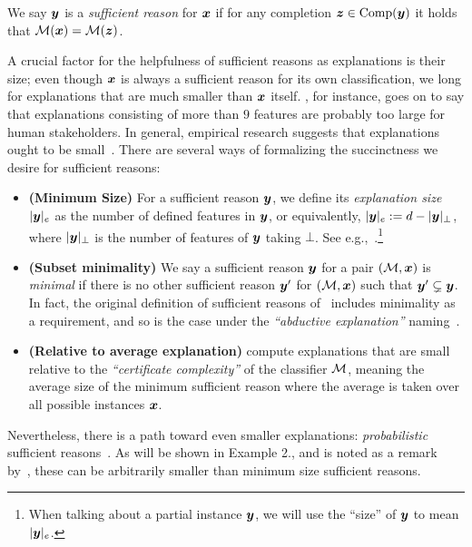 \begin{definition}
	We say ${\bm{y}}$ is a \emph{sufficient reason} for ${\bm{x}}$ if for any completion ${\bm{z}} \in \operatorname{Comp}({\bm{y}})$ it holds that $\mathcal{M}({\bm{x}}) = \mathcal{M}({\bm{z}})$.
	\label{def:sufficient-reason}
\end{definition}
A crucial factor for the helpfulness of sufficient reasons as explanations is their size; even though ${\bm{x}}$ is always a sufficient reason for its own classification, we long for explanations that are much smaller than ${\bm{x}}$ itself. \citet{millerMagicalNumberSeven1956}, for instance, goes on to say that explanations consisting of more than $9$ features are probably too large for human stakeholders. In general, empirical research suggests that explanations ought to be small~\citep{Narayanan_Chen_He_Kim_Gershman_Doshi-Velez_2018, Lage_Chen_He_Narayanan_Kim_Gershman_Doshi-Velez_2019}.
There are several ways of formalizing the succinctness we desire for sufficient reasons:

\begin{itemize}
    \item \textbf{(Minimum Size)} For a sufficient reason ${\bm{y}}$, we define its \emph{explanation size} $|{\bm{y}}|_e$ as the number of defined features in ${\bm{y}}$, or equivalently, $|{\bm{y}}|_e := d - |{\bm{y}}|_\bot$, where $|{\bm{y}}|_\bot$ is the number of features of ${\bm{y}}$ taking $\bot$. See e.g.,~\cite{NEURIPS2020_b1adda14}.\footnote{When talking about a partial instance ${\bm{y}}$, we will use the ``size'' of ${\bm{y}}$ to mean $|{\bm{y}}|_e$.}
    \item \textbf{(Subset minimality)} We say a sufficient reason ${\bm{y}}$ for a pair $(\mathcal{M}, {\bm{x}})$ is \emph{minimal} if there is no other sufficient reason ${\bm{y}}'$ for $(\mathcal{M}, {\bm{x}})$ such that ${\bm{y}}' \subsetneq {\bm{y}}$. In fact, the original definition of sufficient reasons of~\citet{Darwiche_Hirth_2020} includes minimality as a requirement, and so is the case under the \emph{``abductive explanation''} naming~\citep{Ignatiev_Narodytska_Asher_Marques-Silva_2021}.
    \item \textbf{(Relative to average explanation)} \citet{blanc2021provably} compute explanations that are small relative to the \emph{``certificate complexity''} of the classifier $\mathcal{M}$, meaning the average size of the minimum sufficient reason where the average is taken over all possible instances ${\bm{x}}$.
\end{itemize}

Nevertheless, there is a path toward even smaller explanations: \emph{probabilistic} sufficient reasons~\citep{Waldchen_MacDonald_Hauch_Kutyniok_2021, Izza_Huang_Ignatiev_Narodytska_Cooper_Marques-Silva_2023}. 
As will be shown in Example 2., and is noted as a remark by~\citet{blanc2021provably}, these can be arbitrarily smaller than minimum size sufficient reasons.
